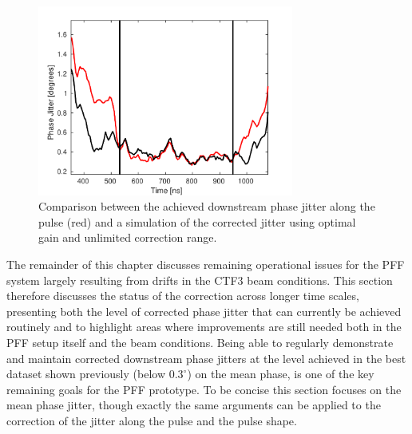 \begin{figure}
  \centering
  \includegraphics[width=0.75\textwidth]{Figures/feedforward/BestFF_SimStdAlongPulse}
  \caption{Comparison between the achieved downstream phase jitter along the pulse (red) and a simulation of the corrected jitter using optimal gain and unlimited correction range.}
  \label{f:BestFF_SimStdPhaseAlong}
\end{figure}


The remainder of this chapter discusses remaining operational issues for the PFF system largely resulting from drifts in the CTF3 beam conditions. This section therefore discusses the status of the correction across longer time scales, presenting both the level of corrected phase jitter that can currently be achieved routinely and to highlight areas where improvements are still needed both in the PFF setup itself and the beam conditions. Being able to regularly demonstrate and maintain corrected downstream phase jitters at the level achieved in the best dataset shown previously (below \(0.3^\circ\)) on the mean phase, is one of the key remaining goals for the PFF prototype. To be concise this section focuses on the mean phase jitter, though exactly the same arguments can be applied to the correction of the jitter along the pulse and the pulse shape.

